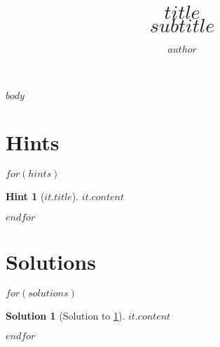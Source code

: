 \documentclass[a4,10pt]{article}
\title{{\bfseries \Huge{$title$}} \\ $subtitle$}
\author{$author$}
\newtheorem{hint}{Hint}
\newtheorem{solution}{Solution}
\begin{document}
\maketitle

$body$

\clearpage
\appendix

\section{Hints}

$for(hints)$
\label{$it.id$:hints}
\begin{hint}[{$it.title$}]
    \label{$it.id$}
    $it.content$
\end{hint}
$endfor$

\clearpage
\section{Solutions}

$for(solutions)$
\begin{solution}[Solution to \cref{$it.id$}]
    \label{$it.id$:solution}
    $it.content$
\end{solution}
$endfor$
\end{document}
